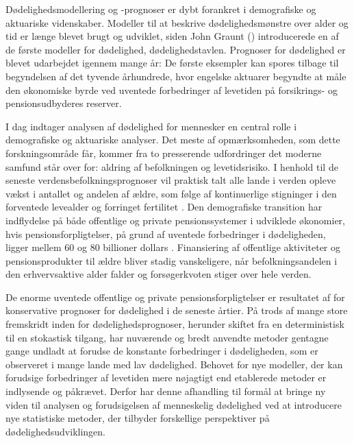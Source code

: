 \documentclass[Thesis]{subfiles}
\begin{document}
D{\o}delighedsmodellering og -prognoser er dybt forankret i demografiske og aktuariske videnskaber. Modeller til at beskrive d{\o}delighedsm{\o}nstre over alder og tid er l{\ae}nge blevet brugt og udviklet, siden John Graunt (\citeyear{graunt1662natural}) introducerede en af de f{\o}rste modeller for d{\o}delighed, d{\o}delighedstavlen. Prognoser for d{\o}delighed er blevet udarbejdet igennem mange {\aa}r: De f{\o}rste eksempler kan spores tilbage til begyndelsen af det tyvende {\aa}rhundrede, hvor engelske aktuarer begyndte at måle den {\o}konomiske byrde ved uventede forbedringer af levetiden på forsikrings- og pensionsudbyderes reserver.

I dag indtager analysen af d{\o}delighed for mennesker en central rolle i demografiske og aktuariske analyser. Det meste af opm{\ae}rksomheden, som dette forskningsområde f{\aa}r, kommer fra to presserende udfordringer det moderne samfund st{\aa}r over for: aldring af befolkningen og levetidsrisiko. I henhold til de seneste verdensbefolkningsprognoser vil praktisk talt alle lande i verden opleve v{\ae}kst i antallet og andelen af {\ae}ldre, som f{\o}lge af kontinuerlige stigninger i den forventede levealder og forringet fertilitet \citep{United2019wpp}. Den demografiske transition har indflydelse p{\aa} b{\aa}de offentlige og private pensionssystemer i udviklede {\o}konomier, hvis pensionsforpligtelser, p{\aa} grund af uventede forbedringer i d{\o}deligheden, ligger mellem 60 og 80 billioner dollars \citep{michaelson2014strategy}. Finansiering af offentlige aktiviteter og pensionsprodukter til {\ae}ldre bliver stadig vanskeligere, n{\aa}r befolkningsandelen i den erhvervsaktive alder falder og fors{\o}gerkvoten stiger over hele verden.

De enorme uventede offentlige og private pensionsforpligtelser er resultatet af for konservative prognoser for d{\o}delighed i de seneste {\aa}rtier. P{\aa} trods af mange store fremskridt inden for d{\o}delighedsprognoser, herunder skiftet fra en deterministisk til en stokastisk tilgang, har nuv{\ae}rende og bredt anvendte metoder gentagne gange undladt at forudse de konstante forbedringer i d{\o}deligheden, som er observeret i mange lande med lav d{\o}delighed. Behovet for nye modeller, der kan forudsige forbedringer af levetiden mere n{\o}jagtigt end etablerede metoder er indlysende og p{\aa}kr{\ae}vet. Derfor har denne afhandling til form{\aa}l at bringe ny viden til analysen og forudsigelsen af menneskelig d{\o}delighed ved at introducere nye statistiske metoder, der tilbyder forskellige perspektiver p{\aa} d{\o}delighedsudviklingen.
\end{document}
